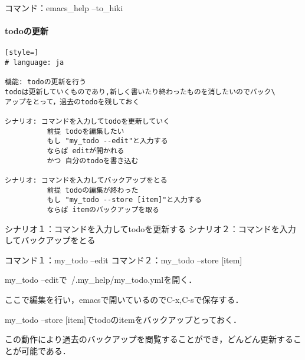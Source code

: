コマンド：emacs\_help --to\_hiki

\paragraph{todoの更新}\begin{lstlisting}[style=]
# language: ja

機能: todoの更新を行う
todoは更新していくものであり,新しく書いたり終わったものを消したいのでバック\
アップをとって，過去のtodoを残しておく

シナリオ: コマンドを入力してtodoを更新していく
          前提 todoを編集したい
          もし "my_todo --edit"と入力する
          ならば editが開かれる
          かつ 自分のtodoを書き込む

シナリオ: コマンドを入力してバックアップをとる
          前提 todoの編集が終わった
          もし "my_todo --store [item]"と入力する
          ならば itemのバックアップを取る
\end{lstlisting}
シナリオ１：コマンドを入力してtodoを更新する
シナリオ２：コマンドを入力してバックアップをとる

コマンド１：my\_todo --edit
コマンド２：my\_todo --store [item]

my\_todo --editで~/.my\_help/my\_todo.ymlを開く．

ここで編集を行い，emacsで開いているのでC-x,C-sで保存する．

my\_todo --store [item]でtodoのitemをバックアップとっておく．

この動作により過去のバックアップを閲覧することができ，どんどん更新することが可能である．

